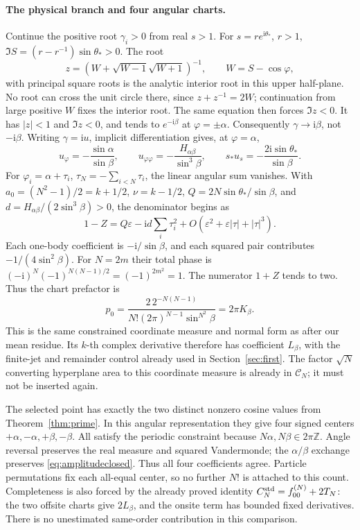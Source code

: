 \documentclass[11pt]{article}
\numberwithin{equation}{section}
\theoremstyle{definition}
\newcommand{\ii}{\mathrm i}
\newcommand{\Z}{\mathbb Z}
\newcommand{\eps}{\varepsilon}
\begin{document}
\paragraph{The physical branch and four angular charts.}
Continue the positive root \(\gamma_i>0\) from real \(s>1\).
For \(s=r e^{\ii\theta_*}\), \(r>1\),
\(\Im S=(r-r^{-1})\sin\theta_*>0\). The root
\[
 z=(W+\sqrt{W-1}\sqrt{W+1})^{-1},\qquad W=S-\cos\varphi,
\]
with principal square roots is the analytic interior root in this
upper half-plane. No root can cross the unit circle there, since
\(z+z^{-1}=2W\); continuation from large positive \(W\) fixes
the interior root. The same equation then forces \(\Im z<0\).
It has \(|z|<1\) and \(\Im z<0\), and tends to
\(e^{-\ii\beta}\) at \(\varphi=\pm\alpha\).
Consequently \(\gamma\to\ii\beta\), not \(-\ii\beta\).
Writing \(\gamma=\ii u\), implicit differentiation gives, at
\(\varphi=\alpha\),
\[
 u_\varphi=-\frac{\sin\alpha}{\sin\beta},\qquad
 u_{\varphi\varphi}=-\frac{H_{\alpha\beta}}{\sin^3\beta},\qquad
 s_*u_s=-\frac{2\ii\sin\theta_*}{\sin\beta}.
\]
For \(\varphi_i=\alpha+\tau_i\),
\(\tau_N=-\sum_{i<N}\tau_i\), the linear angular sum vanishes.
With \(a_0=(N^2-1)/2=k+1/2\), \(\nu=k-1/2\),
\(Q=2N\sin\theta_*/\sin\beta\), and
\(d=H_{\alpha\beta}/(2\sin^3\beta)>0\), the denominator begins as
\[
 1-Z=Q\eps-\ii d\sum_i\tau_i^2
       +O(\eps^2+\eps|\tau|+|\tau|^3).
\]
Each one-body coefficient is \(-\ii/\sin\beta\), and each
squared pair contributes \(-1/(4\sin^2\beta)\).
For \(N=2m\) their total phase is
\((-\ii)^N(-1)^{N(N-1)/2}=(-1)^{2m^2}=1\).
The numerator \(1+Z\) tends to two. Thus the chart prefactor is
\[
 p_0=\frac{2\,2^{-N(N-1)}}{N!(2\pi)^{N-1}\sin^{N^2}\beta}
     =2\pi K_\beta.
\]
This is the same constrained coordinate measure and normal form
as after our mean residue. Its \(k\)-th complex derivative
therefore has coefficient \(L_\beta\), with the finite-jet and
remainder control already used in Section~\ref{sec:first}.
The factor \(\sqrt N\) converting hyperplane area to this coordinate
measure is already in \(\mathscr C_N\); it must not be inserted again.

The selected point has exactly the two distinct nonzero cosine
values from Theorem~\ref{thm:prime}. In this angular representation
they give four signed centers \(+\alpha,-\alpha,+\beta,-\beta\).
All satisfy the periodic constraint because \(N\alpha,N\beta\in2\pi\Z\).
Angle reversal preserves the real measure and squared Vandermonde;
the \(\alpha/\beta\) exchange preserves \eqref{eq:amplitudeclosed}.
Thus all four coefficients agree. Particle permutations fix each
all-equal center, so no further \(N!\) is attached to this count.
Completeness is also forced by the already proved identity
\(C_N^{\rm std}=f_{00}^{(N)}+2T_N\): the two offsite charts give
\(2L_\beta\), and the onsite term has bounded fixed derivatives.
There is no unestimated same-order contribution in this comparison.
\end{document}
